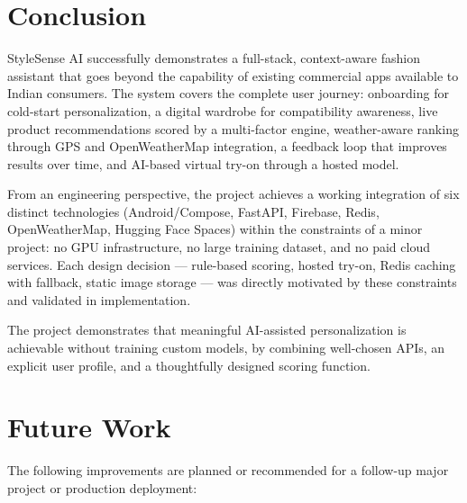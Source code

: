 \documentclass[12pt,a4paper]{report}
\newcommand{\ProjectShort}{StyleSense AI}
\begin{document}
\section{Conclusion}

\ProjectShort{} successfully demonstrates a full-stack, context-aware fashion assistant that goes beyond the capability of existing commercial apps available to Indian consumers. The system covers the complete user journey: onboarding for cold-start personalization, a digital wardrobe for compatibility awareness, live product recommendations scored by a multi-factor engine, weather-aware ranking through GPS and OpenWeatherMap integration, a feedback loop that improves results over time, and AI-based virtual try-on through a hosted model.

From an engineering perspective, the project achieves a working integration of six distinct technologies (Android/Compose, FastAPI, Firebase, Redis, OpenWeatherMap, Hugging Face Spaces) within the constraints of a minor project: no GPU infrastructure, no large training dataset, and no paid cloud services. Each design decision --- rule-based scoring, hosted try-on, Redis caching with fallback, static image storage --- was directly motivated by these constraints and validated in implementation.

The project demonstrates that meaningful AI-assisted personalization is achievable without training custom models, by combining well-chosen APIs, an explicit user profile, and a thoughtfully designed scoring function.

\section{Future Work}

The following improvements are planned or recommended for a follow-up major project or production deployment:
\end{document}
